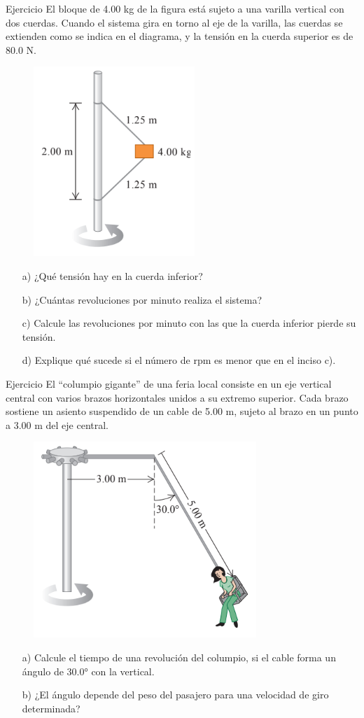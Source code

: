 \begin{frame}{Ejercicio}
    El bloque de 4.00 kg
de la figura está sujeto a
una varilla vertical con dos cuerdas. Cuando el sistema gira en
torno al eje de la varilla, las cuerdas se extienden como se indica
en el diagrama, y la tensión en
la cuerda superior es de 80.0 N.

\begin{figure}
    \centering
    \includegraphics[width=0.25\linewidth]{figures/dos-cuerdas.png}
\end{figure}

\begin{itemize}
    \item[a)] ¿Qué tensión hay en la cuerda
inferior?
\item[b)] ¿Cuántas revoluciones por minuto realiza el sistema?
\item[c)] Calcule las revoluciones por minuto con las que la cuerda inferior pierde su tensión. 
\item[d)] Explique qué sucede si el número de rpm es menor que en el inciso c).
\end{itemize}

\end{frame}

\begin{frame}{Ejercicio}
    El “columpio gigante” de una feria local consiste en un eje vertical central con varios brazos horizontales unidos a su extremo superior. Cada brazo sostiene un asiento suspendido
de un cable de 5.00 m, sujeto al brazo en un punto a 3.00 m del eje
central.

\begin{figure}
    \centering
    \includegraphics[width=0.35\linewidth]{figures/juego-feria.png}
\end{figure}

\begin{itemize}
    \item[a)] Calcule el tiempo de una revolución del columpio, si el
cable forma un ángulo de 30.0° con la vertical.
    \item[b)] ¿El ángulo depende
del peso del pasajero para una velocidad de giro determinada?
\end{itemize}
\end{frame}

